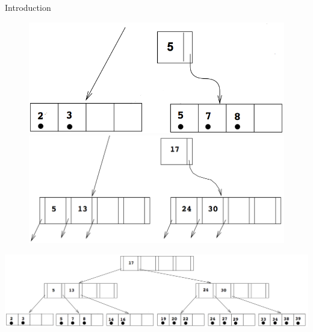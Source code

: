 \documentclass{beamer}
\begin{document}
\begin{section}{Introduction}
\begin{frame}
      \vspace{-2em}
      \begin{figure}[!ht]
        \centering
        \begin{center}
          \includegraphics[valign=t,scale=0.15]{B+Tree_op1.png}
          \quad
          \pause
          \includegraphics[valign=t,scale=0.15]{B+Tree_op2.png}
        \end{center}
      \end{figure}
      \pause

      \begin{center}
      \includegraphics[scale=0.2]{B+Tree_op3.png}
      \end{center}
    \end{frame}
  \end{section}
\end{document}
